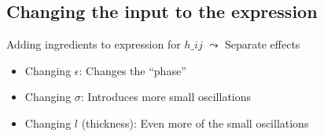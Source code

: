 




    



\subsection{Changing the input to the expression}

\begin{bullets}
    \item Adding ingredients to expression for $h\_{ij}$ $\leadsto$ Separate effects %
    \begin{itemize}
        \item Changing $\epsilon$: Changes the ``phase'' 
        \item Changing $\sigma$: Introduces more small oscillations
        \item Changing $l$ (thickness): Even more of the small oscillations
    \end{itemize}
    \item 
\end{bullets}